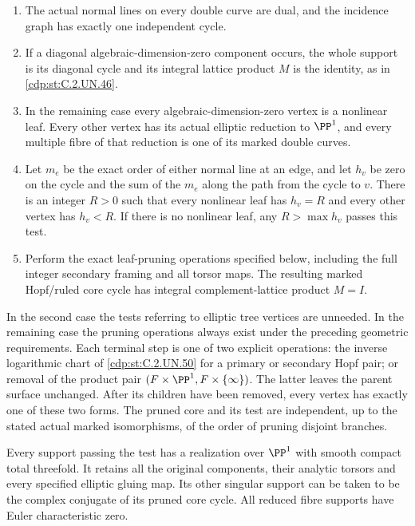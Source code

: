 \begin{proposition}
\begin{enumerate}
\item The actual normal lines on every double curve are dual, and
the incidence graph has exactly one independent cycle.
\item If a diagonal algebraic-dimension-zero component occurs, the
whole support is its diagonal cycle and its integral lattice product
$M$ is the identity, as in \ref{cdp:st:C.2.UN.46}.
\item In the remaining case every algebraic-dimension-zero vertex
is a nonlinear leaf. Every other vertex has its actual elliptic
reduction to $\PP^1$, and every multiple fibre of that reduction
is one of its marked double curves.
\item Let $m_e$ be the exact order of either normal line at an edge,
and let $h_v$ be zero on the cycle and the sum of the $m_e$ along
the path from the cycle to $v$. There is an integer $R>0$ such that
every nonlinear leaf has $h_v=R$ and every other vertex has $h_v<R$.
If there is no nonlinear leaf, any $R>\max h_v$ passes this test.
\item Perform the exact leaf-pruning operations specified below,
including the full integer secondary framing and all torsor maps.
The resulting marked Hopf/ruled core cycle has integral
complement-lattice product $M=I$.
\end{enumerate}

In the second case the tests referring to elliptic tree vertices are
unneeded. In the remaining case the pruning operations always exist
under the preceding geometric requirements. Each terminal step is
one of two explicit operations: the inverse logarithmic chart of
\ref{cdp:st:C.2.UN.50} for a primary or secondary Hopf pair; or removal of the
product pair $(F\times\PP^1,F\times\{\infty\})$. The latter leaves
the parent surface unchanged. After its children have been removed,
every vertex has exactly one of these two forms. The pruned core
and its test are independent, up to the stated actual marked
isomorphisms, of the order of pruning disjoint branches.

Every support passing the test has a realization over $\PP^1$
with smooth compact total threefold. It retains all the original
components, their analytic torsors and every specified elliptic
gluing map. Its other singular support can be taken to be the
complex conjugate of its pruned core cycle. All reduced fibre
supports have Euler characteristic zero.
\end{proposition}

